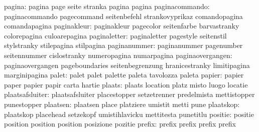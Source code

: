                    pagina: pagina                    page
                           seite                     stranka
                           pagina                    pagina
           paginacommando: paginacommando            pagecommand
                           seitenbefehl              strankovyprikaz
                           comandopagina             comandapagina
              paginakleur: paginakleur               pagecolor
                           seitenfarbe               barvastranky
                           colorepagina              culoarepagina
             paginaletter: paginaletter              pagestyle
                           seitenstil                stylstranky
                           stilepagina               stilpagina
             paginanummer: paginanummer              pagenumber
                           seitennummer              cislostranky
                           numeropagina              numarpagina
         paginaovergangen: paginaovergangen          pageboundaries
                           seitenbegrenzung          hranicestranky
                           limitipagina              marginipagina
                    palet: palet                     palet
                           palette                   paleta
                           tavolozza                 paleta
                   papier: papier                    paper
                           papier                    papir
                           carta                     hartie
                   plaats: plaats                    location
                           platz                     misto
                           luogo                     locatie
          plaatsafsluiter: plaatsafsluiter           placestopper
                           setzetrenner              predelmista
                           mettistopper              punestopper %
                 plaatsen: plaatsen                  place
                           platziere                 umistit
                           metti                     pune %
                plaatskop: plaatskop                 placehead
                           setzekopf                 umistihlavicku
                           mettitesta                punetitlu %
                  positie: positie                   position
                           position                  position
                           posizione                 pozitie %
                   prefix: prefix                    prefix
                           prefix                    prefix
